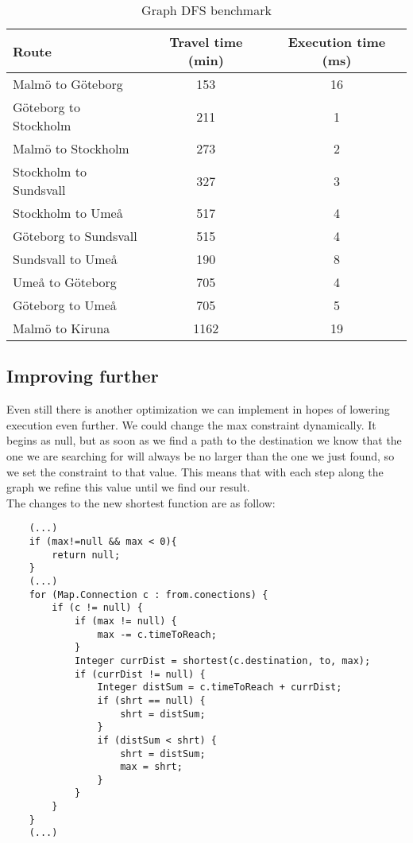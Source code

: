 \documentclass[a4paper,11pt]{article}
\begin{document}
\begin{table}[H]
\begin{center}
\begin{tabular}{l|c|c}
\textbf{Route} & \textbf{Travel time (min)} & \textbf{Execution time (ms)}\\
\hline
    Malmö to Göteborg  &  153 &   16 \\
    Göteborg to Stockholm  &  211 &   1 \\
    Malmö to Stockholm  &  273 &   2 \\
    Stockholm to Sundsvall  &  327 &   3 \\
    Stockholm to Umeå  &  517 &   4 \\
    Göteborg to Sundsvall  &  515 &   4 \\
    Sundsvall to Umeå  &  190 &   8 \\
    Umeå to Göteborg  &  705 &   4 \\
    Göteborg to Umeå  &  705 &   5 \\
    Malmö to Kiruna  &  1162 &   19 \\
\end{tabular}
\caption{Graph DFS benchmark}
\label{tab:table1}
\end{center}
\end{table}

\subsection*{Improving further}

Even still there is another optimization we can implement in hopes of lowering execution even further. We could change the max constraint dynamically. It begins as null, but as soon as we find a path to the destination we know that the one we are searching for will always be no larger than the one we just found, so we set the constraint to that value. This means that with each step along the graph we refine this value until we find our result.
\\

The changes to the new shortest function are as follow:

\begin{verbatim}
    (...)
    if (max!=null && max < 0){
        return null;
    }
    (...)
    for (Map.Connection c : from.conections) {
        if (c != null) {
            if (max != null) {
                max -= c.timeToReach;
            }
            Integer currDist = shortest(c.destination, to, max);
            if (currDist != null) {
                Integer distSum = c.timeToReach + currDist;
                if (shrt == null) {
                    shrt = distSum;
                }
                if (distSum < shrt) {
                    shrt = distSum;
                    max = shrt;
                }
            }
        }
    }
    (...)
\end{verbatim}
\end{document}
